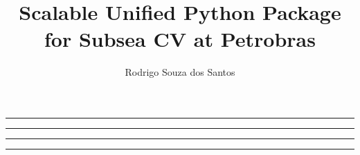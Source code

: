\documentclass[
  letterpaper,
  DIV=11,
  numbers=noendperiod]{scrartcl}
\title{Scalable Unified Python Package for Subsea CV at Petrobras}
\author{Rodrigo Souza dos Santos}
\date{}
\renewcommand*\contentsname{Table of contents}
\newcommand\contentsname{Table of contents}
\begin{document}
\maketitle

\renewcommand*\contentsname{Table of contents}
{
\setcounter{tocdepth}{3}
\tableofcontents
}

\begin{center}\rule{0.5\linewidth}{0.5pt}\end{center}

\begin{center}\rule{0.5\linewidth}{0.5pt}\end{center}

\begin{center}\rule{0.5\linewidth}{0.5pt}\end{center}

\begin{center}\rule{0.5\linewidth}{0.5pt}\end{center}
\end{document}
